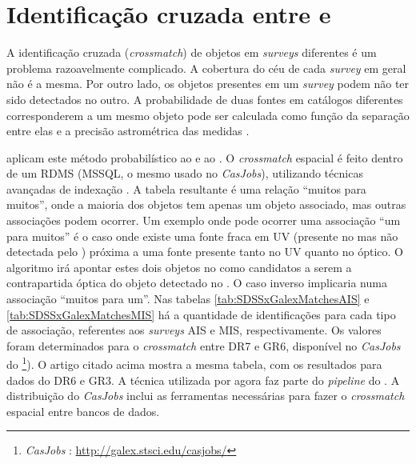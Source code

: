 \section{Identificação cruzada entre \SDSS e \galex}
\label{sec:Crossmatch:SDSSGalex}

A identificação cruzada ({\em crossmatch}) de objetos em {\em surveys}
diferentes é um problema razoavelmente complicado. A cobertura do céu de cada
{\em survey} em geral não é a mesma. Por outro lado, os objetos presentes em um
{\em survey} podem não ter sido detectados no outro. A probabilidade de duas
fontes em catálogos diferentes corresponderem a um mesmo objeto pode ser
calculada como função da separação entre elas e a precisão astrométrica das
medidas \citep{Budavari2008}.

\citet{Budavari2009} aplicam este método probabilístico ao \SDSS e ao \galex. O
{\em crossmatch} espacial é feito dentro de um RDMS (MSSQL, o mesmo usado no
{\em CasJobs}), utilizando técnicas avançadas de indexação \citep[ {\em
Hierarchic Triangular Mesh}]{Kunszt2000}. A tabela resultante é uma relação
``muitos para muitos'', onde a maioria dos objetos \galex tem apenas um objeto
\SDSS associado, mas outras associações podem ocorrer. Um exemplo onde pode
ocorrer uma associação ``um para muitos'' é o caso onde existe uma fonte fraca
em UV (presente no \SDSS mas não detectada pelo \galex) próxima a uma fonte
presente tanto no UV quanto no óptico. O algoritmo irá apontar estes dois
objetos no \SDSS como candidatos a serem a contrapartida óptica do objeto
detectado no \galex. O caso inverso implicaria numa associação ``muitos para
um''. Nas tabelas \ref{tab:SDSSxGalexMatchesAIS} e
\ref{tab:SDSSxGalexMatchesMIS} há a quantidade de identificações para cada tipo
de associação, referentes aos {\em surveys} AIS e MIS, respectivamente. Os
valores foram determinados para o {\em crossmatch} entre \SDSS DR7 e \galex GR6,
disponível no {\em CasJobs} do \galex\footnote{{\em CasJobs} \galex:
\url{http://galex.stsci.edu/casjobs/}}). O artigo citado acima mostra a mesma
tabela, com os resultados para dados do \SDSS DR6 e \galex GR3. A técnica
utilizada por \citeauthor{Budavari2009} agora faz parte do {\em pipeline} do
\galex. A distribuição do {\em CasJobs} inclui as ferramentas necessárias para
fazer o {\em crossmatch} espacial entre bancos de dados.

